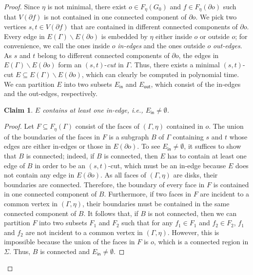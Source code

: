 \documentclass[a4paper,11pt]{article}
\numberwithin{lemma}{section}
\newtheorem{claim}[theorem]{Claim}
\newenvironment{claimproof}{\begin{proof}\renewcommand{\qedsymbol}{$\lrcorner$}}{\end{proof}}
\begin{document}
\begin{proof}
Since $\eta$ is not minimal, there exist $o \in F_\eta(G_0)$ and $f \in F_\eta(\partial o)$ such that $V(\partial f)$ is not contained in one connected component of $\partial o$.
We pick two vertices $s,t \in V(\partial f)$ that are contained in different connected components of $\partial o$.
Every edge in $E(\varGamma) \backslash E(\partial o)$ is embedded by $\eta$ either inside $o$ or outside $o$; for convenience, we call the ones inside $o$ \emph{in-edges} and the ones outside $o$ \emph{out-edges}.
As $s$ and $t$ belong to different connected components of $\partial o$, the edges in $E(\varGamma) \backslash E(\partial o)$ form an $(s,t)$-\emph{cut} in $\varGamma$.
Thus, there exists a minimal $(s,t)$-cut $E \subseteq E(\varGamma) \backslash E(\partial o)$, which can clearly be computed in polynomial time.
We can partition $E$ into two subsets $E_\mathsf{in}$ and $E_\mathsf{out}$, which consist of the in-edges and the out-edges, respectively.

\begin{claim}
 \label{claim:in-edge-non-empty}
 $E$ contains at least one in-edge, i.e., $E_\mathsf{in} \neq \emptyset$.
\end{claim}
\begin{claimproof}
 Let $F \subseteq F_\eta(\varGamma)$ consist of the faces of $(\varGamma,\eta)$ contained in $o$.
 The union of the boundaries of the faces in $F$ is a subgraph $B$ of $\varGamma$ containing $s$ and $t$ whose edges are either in-edges or those in $E(\partial o)$.
 To see $E_\mathsf{in} \neq \emptyset$, it suffices to show that $B$ is connected; indeed, if $B$ is connected, then $E$ has to contain at least one edge of $B$ in order to be an $(s,t)$-cut, which must be an in-edge because $E$ does not contain any edge in $E(\partial o)$.
 As all faces of $(\varGamma,\eta)$ are disks, their boundaries are connected.
 Therefore, the boundary of every face in $F$ is contained in one connected component of $B$.
 Furthermore, if two faces in $F$ are incident to a common vertex in $(\varGamma,\eta)$, their boundaries must be contained in the same connected component of $B$.
 It follows that, if $B$ is not connected, then we can partition $F$ into two subsets $F_1$ and $F_2$ such that for any $f_1 \in F_1$ and $f_2 \in F_2$, $f_1$ and $f_2$ are not incident to a common vertex in $(\varGamma,\eta)$.
 However, this is impossible because the union of the faces in $F$ is $o$, which is a connected region in $\varSigma$.
 Thus, $B$ is connected and $E_\mathsf{in} \neq \emptyset$.
\end{claimproof}


\end{proof}
\end{document}

